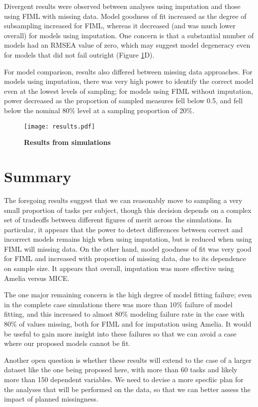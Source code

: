 \documentclass[11pt, oneside]{article}   	%
\begin{document}
Divergent results were observed between analyses using imputation and those using FIML with missing data.  Model goodness of fit increased as the degree of subsampling increased for FIML, whereas it decreased (and was much lower overall) for models using imputation.  One concern is that a substantial number of models had an RMSEA value of zero, which may suggest model degeneracy even for models that did not fail outright (Figure \ref{fig:results}D).  

For model comparison, results also differed between missing data approaches. For models using imputation, there was very high power to identify the correct model even at the lowest levels of sampling; for models using FIML without imputation, power decreased as the proportion of sampled measures fell below 0.5, and fell below the nominal 80\% level at a sampling proportion of 20\%.  

\begin{figure}[!h]
\caption{\textbf{Results from simulations}}
\centering
\texttt{[image: results.pdf]}
\label{fig:results}
\end{figure}

\section{Summary}
The foregoing results suggest that we can reasonably move to sampling a very small proportion of tasks per subject, though this decision depends on a complex set of tradeoffs between different figures of merit across the simulations.  In particular, it appears that the power to detect differences between correct and incorrect models remains high when using imputation, but is reduced when using FIML will missing data.  On the other hand, model goodness of fit was very good for FIML and increased with proportion of missing data, due to its dependence on sample size.  It appears that overall, imputation was more effective using Amelia versus MICE.  

The one major remaining concern is the high degree of model fitting failure; even in the complete case simulations there was more than 10\% failure of model fitting, and this increased to almost 80\% modeling failure rate in the case with 80\% of values missing, both for FIML and for imputation using Amelia.  It would be useful to gain more insight into these failures so that we can avoid a case where our proposed models cannot be fit. 

Another open question is whether these results will extend to the case of a larger dataset like the one being proposed here, with more than 60 tasks and likely more than 150 dependent variables.  We need to devise a more specfiic plan for the analyses that will be performed on the data, so that we can better assess the impact of planned missingness.

\end{document}
